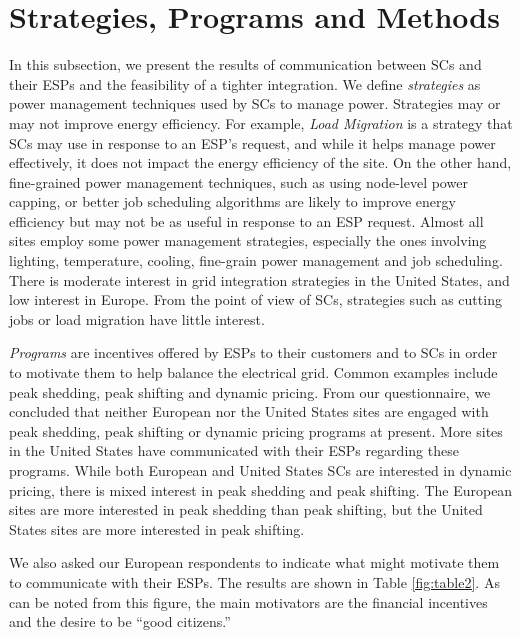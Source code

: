 \documentclass{article}
\begin{document}
\section{Strategies, Programs and Methods}
\label{spm}
In this subsection, we present the results of communication between SCs and their ESPs and the feasibility of a tighter integration. We define \emph{strategies} as power management techniques used by SCs to manage power. Strategies may or may not improve energy efficiency. For example, \emph{Load Migration} is a strategy that SCs may use in response to an ESP's request, and while it helps manage power effectively, it does not impact the energy efficiency of the site. On the other hand, fine-grained power management techniques, such as using node-level power capping, or better job scheduling algorithms are likely to improve energy efficiency but may not be as useful in response to an ESP request. Almost all sites employ some power management strategies, especially the ones involving lighting, temperature, cooling, fine-grain power management and job scheduling. There is moderate interest in grid integration strategies in the United States, and low interest in Europe. From the point of view of SCs, strategies such as cutting jobs or load migration have little interest. 

\emph{Programs} are incentives offered by ESPs to their customers and to SCs in order to motivate them to help balance the electrical grid. Common examples include peak shedding, peak shifting and dynamic pricing. From our questionnaire, we concluded that neither European nor the United States sites are engaged with peak shedding, peak shifting or dynamic pricing programs at present. More sites in the United States have communicated with their ESPs regarding these programs. While both European and United States SCs are interested in dynamic pricing, there is mixed interest in peak shedding and peak shifting. The European sites are more interested in peak shedding than peak shifting, but the United States sites are more interested in peak shifting. 

We also asked our European respondents to indicate what might motivate them to communicate with their ESPs. The results are shown in Table \ref{fig:table2}. As can be noted from this figure, the main motivators are the financial incentives and the desire to be ``good citizens.''
\end{document}
